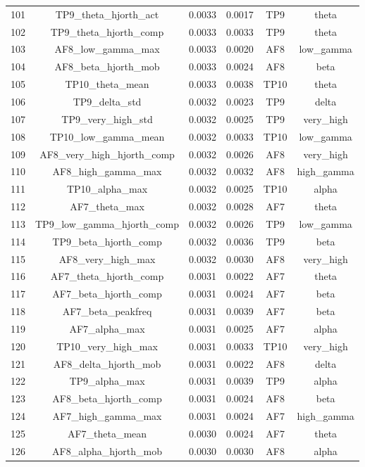 \begin{table}[hptb]
\begin{table}
\begin{tabular}{cccccc}
101 & TP9_theta_hjorth_act & 0.0033 & 0.0017 & TP9 & theta \\
102 & TP9_theta_hjorth_comp & 0.0033 & 0.0033 & TP9 & theta \\
103 & AF8_low_gamma_max & 0.0033 & 0.0020 & AF8 & low_gamma \\
104 & AF8_beta_hjorth_mob & 0.0033 & 0.0024 & AF8 & beta \\
105 & TP10_theta_mean & 0.0033 & 0.0038 & TP10 & theta \\
106 & TP9_delta_std & 0.0032 & 0.0023 & TP9 & delta \\
107 & TP9_very_high_std & 0.0032 & 0.0025 & TP9 & very_high \\
108 & TP10_low_gamma_mean & 0.0032 & 0.0033 & TP10 & low_gamma \\
109 & AF8_very_high_hjorth_comp & 0.0032 & 0.0026 & AF8 & very_high \\
110 & AF8_high_gamma_max & 0.0032 & 0.0032 & AF8 & high_gamma \\
111 & TP10_alpha_max & 0.0032 & 0.0025 & TP10 & alpha \\
112 & AF7_theta_max & 0.0032 & 0.0028 & AF7 & theta \\
113 & TP9_low_gamma_hjorth_comp & 0.0032 & 0.0026 & TP9 & low_gamma \\
114 & TP9_beta_hjorth_comp & 0.0032 & 0.0036 & TP9 & beta \\
115 & AF8_very_high_max & 0.0032 & 0.0030 & AF8 & very_high \\
116 & AF7_theta_hjorth_comp & 0.0031 & 0.0022 & AF7 & theta \\
117 & AF7_beta_hjorth_comp & 0.0031 & 0.0024 & AF7 & beta \\
118 & AF7_beta_peakfreq & 0.0031 & 0.0039 & AF7 & beta \\
119 & AF7_alpha_max & 0.0031 & 0.0025 & AF7 & alpha \\
120 & TP10_very_high_max & 0.0031 & 0.0033 & TP10 & very_high \\
121 & AF8_delta_hjorth_mob & 0.0031 & 0.0022 & AF8 & delta \\
122 & TP9_alpha_max & 0.0031 & 0.0039 & TP9 & alpha \\
123 & AF8_beta_hjorth_comp & 0.0031 & 0.0024 & AF8 & beta \\
124 & AF7_high_gamma_max & 0.0031 & 0.0024 & AF7 & high_gamma \\
125 & AF7_theta_mean & 0.0030 & 0.0024 & AF7 & theta \\
126 & AF8_alpha_hjorth_mob & 0.0030 & 0.0030 & AF8 & alpha \\

\end{tabular}
\end{table}
\end{table}
